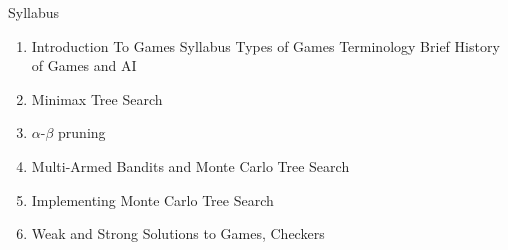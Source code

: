 \documentclass{powerdot}
\begin{document}
\begin{slide}{Syllabus}
  \begin{enumerate}
    \item Introduction To Games
      \subitem Syllabus
      \subitem Types of Games
      \subitem Terminology
      \subitem Brief History of Games and AI
    \item Minimax Tree Search
    \item $\alpha$-$\beta$ pruning
    \item Multi-Armed Bandits and Monte Carlo Tree Search
    \item Implementing Monte Carlo Tree Search
    \item Weak and Strong Solutions to Games, Checkers
  \end{enumerate}
\end{slide}
\end{document}

